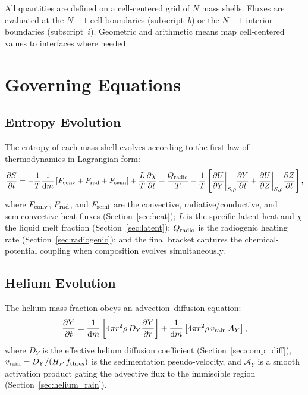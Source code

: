 \documentclass{aastex631}
\newcommand{\dd}{\mathrm{d}}
\newcommand{\pp}{\partial}
\newcommand{\Hp}{H_P}
\begin{document}
All quantities are defined on a cell-centered grid of $N$ mass shells.
Fluxes are evaluated at the $N+1$ cell boundaries (subscript~$b$) or the
$N-1$ interior boundaries (subscript~$i$).  Geometric and arithmetic means
map cell-centered values to interfaces where needed.

\section{Governing Equations}\label{sec:governing}

\subsection{Entropy Evolution}\label{sec:entropy}

The entropy of each mass shell evolves according to the first law of
thermodynamics in Lagrangian form:
\begin{equation}\label{eq:entropy_master}
  \frac{\pp S}{\pp t}
  = -\frac{1}{T}\frac{1}{\dd m}\left[
      F_{\rm conv} + F_{\rm rad} + F_{\rm semi}
    \right]
  + \frac{L}{T}\frac{\pp\chi}{\pp t}
  + \frac{Q_{\rm radio}}{T}
  - \frac{1}{T}\left[
      \frac{\pp U}{\pp Y}\bigg|_{S,\rho}\frac{\pp Y}{\pp t}
    + \frac{\pp U}{\pp Z}\bigg|_{S,\rho}\frac{\pp Z}{\pp t}
    \right],
\end{equation}
where $F_{\rm conv}$, $F_{\rm rad}$, and $F_{\rm semi}$ are the
convective, radiative/conductive, and semiconvective heat fluxes
(Section~\ref{sec:heat}); $L$ is the specific latent heat and $\chi$ the
liquid melt fraction (Section~\ref{sec:latent}); $Q_{\rm radio}$ is the
radiogenic heating rate (Section~\ref{sec:radiogenic}); and the final
bracket captures the chemical-potential coupling when composition evolves
simultaneously.

\subsection{Helium Evolution}\label{sec:helium_gov}

The helium mass fraction obeys an advection--diffusion equation:
\begin{equation}\label{eq:Y_master}
  \frac{\pp Y}{\pp t}
  = \frac{1}{\dd m}\left[
      4\pi r^2\rho\,D_Y\frac{\pp Y}{\pp r}
    \right]
  + \frac{1}{\dd m}\left[
      4\pi r^2\rho\,v_{\rm rain}\,\mathcal{A}_Y
    \right],
\end{equation}
where $D_Y$ is the effective helium diffusion coefficient
(Section~\ref{sec:comp_diff}), $v_{\rm rain}=D_Y/(\Hp\,f_{\rm thres})$ is
the sedimentation pseudo-velocity, and $\mathcal{A}_Y$ is a smooth
activation product gating the advective flux to the immiscible region
(Section~\ref{sec:helium_rain}).
\end{document}
